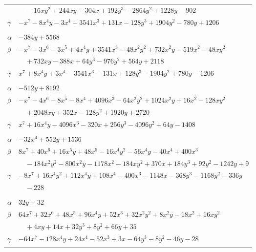 \documentclass[11pt]{article}
\begin{document}
\begin{longtable}{@{}ll@{}}
 & $\quad -16xy^{2}+244xy-304x+192y^{3}-2864y^{2}+1228y-902$\\
$\gamma$ & $-x^{7}-8x^{4}y-3x^{4}+3541x^{3}+131x-128y^{3}+1904y^{2}-780y+1206$\\
\addlinespace[3pt]
\multicolumn{2}{@{}l}{$\{i,j\}=\{20,23\}$, $k_{ij}=2^{5}\cdot 3^{4}\cdot 5$}\\
$\alpha$ & $-384y+5568$\\
$\beta$ & $-x^{7}-3x^{6}-3x^{5}+4x^{4}y+3541x^{3}-48x^{2}y^{2}+732x^{2}y-519x^{2}-48xy^{2}$\\
 & $\quad +732xy-388x+64y^{3}-976y^{2}+564y+2118$\\
$\gamma$ & $x^{7}+8x^{4}y+3x^{4}-3541x^{3}-131x+128y^{3}-1904y^{2}+780y-1206$\\
\addlinespace[3pt]
\multicolumn{2}{@{}l}{$\{i,j\}=\{22,23\}$, $k_{ij}=2^{6}\cdot 3^{3}\cdot 11$}\\
$\alpha$ & $-512y+8192$\\
$\beta$ & $-x^{7}-4x^{6}-8x^{5}-8x^{4}+4096x^{3}-64x^{2}y^{2}+1024x^{2}y+16x^{2}-128xy^{2}$\\
 & $\quad +2048xy+352x-128y^{2}+1920y+2720$\\
$\gamma$ & $x^{7}+16x^{4}y-4096x^{3}-320x+256y^{3}-4096y^{2}+64y-1408$\\
\addlinespace[3pt]
\multicolumn{2}{@{}l}{$\{i,j\}=\{25,31\}$, $k_{ij}=3^{4}\cdot 5\cdot 7$}\\
$\alpha$ & $-32x^{4}+552y+1536$\\
$\beta$ & $8x^{7}+40x^{6}+16x^{5}y+48x^{5}-16x^{4}y^{2}-56x^{4}y-40x^{4}+400x^{3}$\\
 & $\quad -184x^{2}y^{2}-800x^{2}y-1178x^{2}-184xy^{2}+370x+184y^{3}+92y^{2}-1242y+9$\\
$\gamma$ & $-8x^{7}+16x^{4}y^{2}+112x^{4}y+108x^{4}-400x^{3}-1148x-368y^{3}-1168y^{2}-336y$\\
 & $\quad -228$\\
\addlinespace[3pt]
\multicolumn{2}{@{}l}{$\{i,j\}=\{30,31\}$, $k_{ij}=2^{2}\cdot 3^{2}$}\\
$\alpha$ & $32y+32$\\
$\beta$ & $64x^{7}+32x^{6}+48x^{5}+96x^{4}y+52x^{3}+32x^{2}y^{2}+8x^{2}y-18x^{2}+16xy^{2}$\\
 & $\quad +4xy+14x+32y^{3}+8y^{2}+66y+35$\\
$\gamma$ & $-64x^{7}-128x^{4}y+24x^{4}-52x^{3}+3x-64y^{3}-8y^{2}-46y-28$\\
\addlinespace[3pt]
\multicolumn{2}{@{}l}{$\{i,j\}=\{30,32\}$, $k_{ij}=2^{5}\cdot 3$}\\

\end{longtable}
\end{document}
